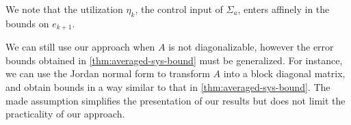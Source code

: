 
We note that the utilization $\eta_{k}$, \ie the control input of $\Sigma_{a}$, enters affinely in the bounds on $e_{k+1}$.

\begin{remark}
We can still use our approach when $A$ is not
diagonalizable, however the error bounds obtained in
\cref{thm:averaged-sys-bound} must be generalized. For instance, we can
use the Jordan normal form to transform $A$ into a block diagonal
matrix, and obtain bounds in a way similar to that in
\cref{thm:averaged-sys-bound}. The made assumption simplifies the
presentation of our results but does not limit the practicality of our
approach. %
\end{remark}

